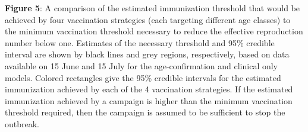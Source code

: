 \textbf{Figure 5}: A comparison of the estimated immunization threshold that would be achieved by four vaccination strategies (each targeting different age classes) to the minimum vaccination threshold necessary to reduce the effective reproduction number below one. Estimates of the necessary threshold and 95\% credible interval are shown by black lines and grey regions, respectively, based on data available on 15 June and 15 July for the age-confirmation and clinical only models. Colored rectangles give the 95\% credible intervals for the estimated immunization achieved by each of the 4 vaccination strategies. If the estimated immunization achieved by a campaign is higher than the minimum vaccination threshold required, then the campaign is assumed to be sufficient to stop the outbreak.